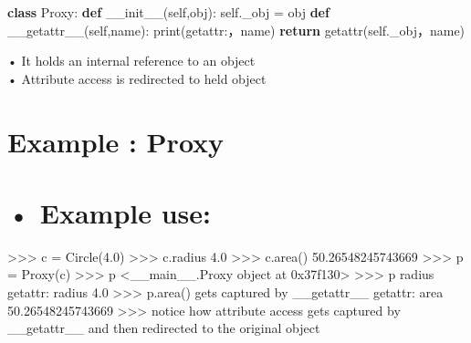 \documentclass[
  letterpaper,
  DIV=11,
  numbers=noendperiod]{scrreprt}
\newenvironment{Shaded}{\begin{snugshade}}{\end{snugshade}}
\newcommand{\BuiltInTok}[1]{\textcolor[rgb]{0.00,0.23,0.31}{#1}}
\newcommand{\ControlFlowTok}[1]{\textcolor[rgb]{0.00,0.23,0.31}{\textbf{#1}}}
\newcommand{\FunctionTok}[1]{\textcolor[rgb]{0.28,0.35,0.67}{#1}}
\newcommand{\KeywordTok}[1]{\textcolor[rgb]{0.00,0.23,0.31}{\textbf{#1}}}
\newcommand{\NormalTok}[1]{\textcolor[rgb]{0.00,0.23,0.31}{#1}}
\newcommand{\OperatorTok}[1]{\textcolor[rgb]{0.37,0.37,0.37}{#1}}
\newcommand{\StringTok}[1]{\textcolor[rgb]{0.13,0.47,0.30}{#1}}
\newcommand{\VariableTok}[1]{\textcolor[rgb]{0.07,0.07,0.07}{#1}}
\begin{document}
\begin{Shaded}
\begin{Highlighting}[]
\KeywordTok{class}\NormalTok{ Proxy: }\KeywordTok{def} \FunctionTok{\_\_init\_\_}\NormalTok{(}\VariableTok{self}\NormalTok{,obj): }\VariableTok{self}\NormalTok{.\_obj }\OperatorTok{=}\NormalTok{ obj }\KeywordTok{def} \FunctionTok{\_\_getattr\_\_}\NormalTok{(}\VariableTok{self}\NormalTok{,name): }\BuiltInTok{print}\NormalTok{(}\StringTok{\textquotesingle{}getattr:\textquotesingle{}}\NormalTok{，name) }\ControlFlowTok{return} \BuiltInTok{getattr}\NormalTok{(}\VariableTok{self}\NormalTok{.\_obj，name) }
\end{Highlighting}
\end{Shaded}

• It holds an internal reference to an object\\
• Attribute access is redirected to held object


\chapter{Example : Proxy}\label{example-proxy-1}


\chapter{• Example use:}\label{example-use-3}

\begin{Shaded}
\begin{Highlighting}[]
\NormalTok{\textgreater{}\textgreater{}\textgreater{} c = Circle(4.0)  }
\NormalTok{\textgreater{}\textgreater{}\textgreater{} c.radius  }
\NormalTok{4.0  }
\NormalTok{\textgreater{}\textgreater{}\textgreater{} c.area()  }
\NormalTok{50.26548245743669  }
\NormalTok{\textgreater{}\textgreater{}\textgreater{} p = Proxy(c)  }
\NormalTok{\textgreater{}\textgreater{}\textgreater{} p  }
\NormalTok{\textless{}\_\_main\_\_.Proxy object at 0x37f130\textgreater{}  }
\NormalTok{\textgreater{}\textgreater{}\textgreater{} p radius  }
\NormalTok{getattr: radius  }
\NormalTok{4.0  }
\NormalTok{\textgreater{}\textgreater{}\textgreater{} p.area()  }
\NormalTok{gets captured by \_\_getattr\_\_  }
\NormalTok{getattr: area  }
\NormalTok{50.26548245743669  }
\NormalTok{\textgreater{}\textgreater{}\textgreater{} notice how attribute access gets captured by \_\_getattr\_\_ and then redirected to the original object }
\end{Highlighting}
\end{Shaded}
\end{document}
